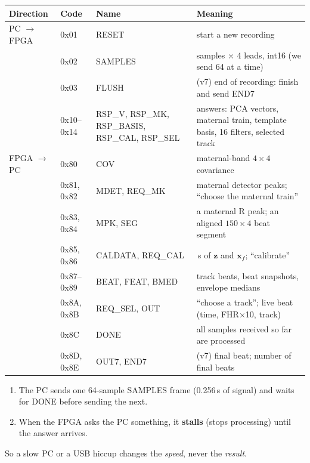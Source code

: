 \documentclass[11pt]{article}
\begin{document}
\begin{center}
\small
\begin{tabularx}{\linewidth}{@{}l l >{\raggedright\arraybackslash}p{3.9cm} >{\raggedright\arraybackslash}X@{}}
\toprule
\textbf{Direction} & \textbf{Code} & \textbf{Name} & \textbf{Meaning} \\
\midrule
PC $\to$ FPGA & 0x01 & RESET & start a new recording \\
 & 0x02 & SAMPLES & samples $\times$ 4 leads, int16 (we send 64 at a time) \\
 & 0x03 & FLUSH & (v7) end of recording: finish and send END7 \\
 & 0x10--0x14 & RSP\_V, RSP\_MK, RSP\_BASIS, RSP\_CAL, RSP\_SEL & answers: PCA vectors, maternal train, template basis, 16 filters, selected track \\
FPGA $\to$ PC & 0x80 & COV & maternal-band $4\times4$ covariance \\
 & 0x81, 0x82 & MDET, REQ\_MK & maternal detector peaks; ``choose the maternal train'' \\
 & 0x83, 0x84 & MPK, SEG & a maternal R peak; an aligned $150\times4$ beat segment \\
 & 0x85, 0x86 & CALDATA, REQ\_CAL & 12\,s of $\mathbf{z}$ and $\mathbf{x}_f$; ``calibrate'' \\
 & 0x87--0x89 & BEAT, FEAT, BMED & track beats, beat snapshots, envelope medians \\
 & 0x8A, 0x8B & REQ\_SEL, OUT & ``choose a track''; live beat (time, FHR$\times$10, track) \\
 & 0x8C & DONE & all samples received so far are processed \\
 & 0x8D, 0x8E & OUT7, END7 & (v7) final beat; number of final beats \\
\bottomrule
\end{tabularx}
\end{center}

\begin{keyfact}
\begin{enumerate}
  \item The PC sends one 64-sample SAMPLES frame (0.256\,s of signal) and waits for DONE before sending the next.
  \item When the FPGA asks the PC something, it \textbf{stalls} (stops processing) until the answer arrives.
\end{enumerate}
So a slow PC or a USB hiccup changes the \emph{speed}, never the \emph{result}.
\end{keyfact}
\end{document}
